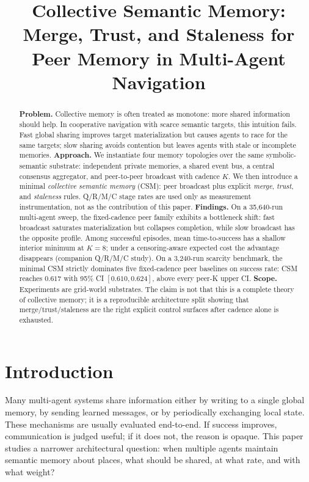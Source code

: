 \documentclass{article}
\title{Collective Semantic Memory: Merge, Trust, and Staleness for Peer Memory in Multi-Agent Navigation}
\begin{document}
\maketitle

\begin{abstract}
\textbf{Problem.} Collective memory is often treated as monotone: more shared information should help. In cooperative navigation with scarce semantic targets, this intuition fails. Fast global sharing improves target materialization but causes agents to race for the same targets; slow sharing avoids contention but leaves agents with stale or incomplete memories.
\textbf{Approach.} We instantiate four memory topologies over the same symbolic-semantic substrate: independent private memories, a shared event bus, a central consensus aggregator, and peer-to-peer broadcast with cadence $K$. We then introduce a minimal \emph{collective semantic memory} (CSM): peer broadcast plus explicit \emph{merge}, \emph{trust}, and \emph{staleness} rules. Q/R/M/C stage rates are used only as measurement instrumentation, not as the contribution of this paper.
\textbf{Findings.} On a 35{,}640-run multi-agent sweep, the fixed-cadence peer family exhibits a bottleneck shift: fast broadcast saturates materialization but collapses completion, while slow broadcast has the opposite profile. Among successful episodes, mean time-to-success has a shallow interior minimum at $K{=}8$; under a censoring-aware expected cost the advantage disappears (companion Q/R/M/C study). On a 3{,}240-run scarcity benchmark, the minimal CSM strictly dominates five fixed-cadence peer baselines on success rate: CSM reaches $0.617$ with 95\% CI $[0.610,0.624]$, above every peer-K upper CI.
\textbf{Scope.} Experiments are grid-world substrates. The claim is not that this is a complete theory of collective memory; it is a reproducible architecture split showing that merge/trust/staleness are the right explicit control surfaces after cadence alone is exhausted.
\end{abstract}

\section{Introduction}

Many multi-agent systems share information either by writing to a
single global memory, by sending learned messages, or by periodically
exchanging local state. These mechanisms are usually evaluated
end-to-end. If success improves, communication is judged useful; if it
does not, the reason is opaque. This paper studies a narrower
architectural question: when multiple agents maintain semantic memory
about places, what should be shared, at what rate, and with what
weight?
\end{document}
